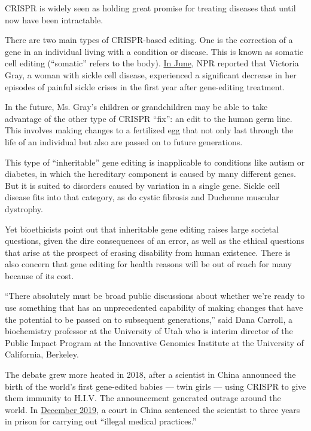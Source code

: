 CRISPR is widely seen as holding great promise for treating diseases
that until now have been intractable.

There are two main types of CRISPR-based editing. One is the correction
of a gene in an individual living with a condition or disease. This is
known as somatic cell editing (``somatic'' refers to the body).
\href{https://www.npr.org/sections/health-shots/2020/06/23/877543610/a-year-in-1st-patient-to-get-gene-editing-for-sickle-cell-disease-is-thriving}{In
June}, NPR reported that Victoria Gray, a woman with sickle cell
disease, experienced a significant decrease in her episodes of painful
sickle crises in the first year after gene-editing treatment.

In the future, Ms. Gray's children or grandchildren may be able to take
advantage of the other type of CRISPR ``fix'': an edit to the human germ
line. This involves making changes to a fertilized egg that not only
last through the life of an individual but also are passed on to future
generations.

This type of ``inheritable'' gene editing is inapplicable to conditions
like autism or diabetes, in which the hereditary component is caused by
many different genes. But it is suited to disorders caused by variation
in a single gene. Sickle cell disease fits into that category, as do
cystic fibrosis and Duchenne muscular dystrophy.

Yet bioethicists point out that inheritable gene editing raises large
societal questions, given the dire consequences of an error, as well as
the ethical questions that arise at the prospect of erasing disability
from human existence. There is also concern that gene editing for health
reasons will be out of reach for many because of its cost.

``There absolutely must be broad public discussions about whether we're
ready to use something that has an unprecedented capability of making
changes that have the potential to be passed on to subsequent
generations,'' said Dana Carroll, a biochemistry professor at the
University of Utah who is interim director of the Public Impact Program
at the Innovative Genomics Institute at the University of California,
Berkeley.

The debate grew more heated in 2018, after a scientist in China
announced the birth of the world's first gene-edited babies --- twin
girls --- using CRISPR to give them immunity to H.I.V. The announcement
generated outrage around the world. In
\href{https://www.nytimes.com/2019/12/30/business/china-scientist-genetic-baby-prison.html}{December
2019}, a court in China sentenced the scientist to three years in prison
for carrying out ``illegal medical practices.''

